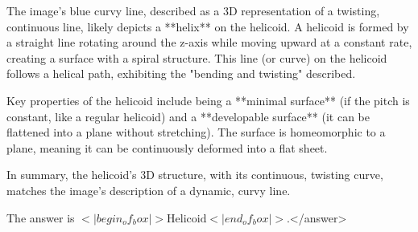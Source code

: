 The image’s blue curvy line, described as a 3D representation of a twisting, continuous line, likely depicts a **helix** on the helicoid. A helicoid is formed by a straight line rotating around the z-axis while moving upward at a constant rate, creating a surface with a spiral structure. This line (or curve) on the helicoid follows a helical path, exhibiting the "bending and twisting" described.  

Key properties of the helicoid include being a **minimal surface** (if the pitch is constant, like a regular helicoid) and a **developable surface** (it can be flattened into a plane without stretching). The surface is homeomorphic to a plane, meaning it can be continuously deformed into a flat sheet.  

In summary, the helicoid’s 3D structure, with its continuous, twisting curve, matches the image’s description of a dynamic, curvy line.  

The answer is \(<|begin_of_box|>\text{Helicoid}<|end_of_box|>\).</answer>